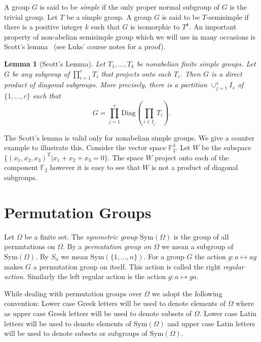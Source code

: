 \documentclass[11pt]{madras}%
\newtheorem{lemma}[theorem]{Lemma}
\theoremstyle{remark}
\newcommand{\Sym}[1]{{\ensuremath{\mathrm{Sym}\left(#1\right)}}}
\newcommand{\Diag}[2][]{{\ensuremath{\mathrm{Diag}_{{#1}}\left(#2\right)}}}
\newcommand{\bigtimes}{\prod}
\newcommand{\nomclpermg}[3][]{{\nomenclature[p#1]{#2}{#3}}}
\begin{document}
A group $G$ is said to be \emph{simple} if the only proper normal
subgroup of $G$ is the trivial group.  Let $T$ be a simple group. A
group $G$ is said to be $T$-semisimple if there is a positive integer
$k$ such that $G$ is isomorphic to $T^k$.  An important property of
non-abelian semisimple group which we will use in many occasions is
Scott's lemma~\cite{scott1980representation} (see Luks' course notes
for a proof\cite[page 38]{luks90lecture}).%
%

\begin{lemma}[Scott's Lemma]\label{lem-scott}
  Let $T_1,\ldots,T_k$ be nonabelian finite simple groups. Let $G$ be
  any subgroup of $\prod_{i=1}^r T_i$ that projects \emph{onto} each
  $T_i$.  Then $G$ is a direct product of diagonal subgroups. More
  precisely, there is a partition $\cup_{j=1}^s I_s$ of
  $\{1,\ldots,r\}$ such that
  \[
  G=\prod_{j=1}^s\Diag{\bigtimes_{i\in I_j}T_i}.
  \]
\end{lemma}

The Scott's lemma is valid only for nonabelian simple groups. We give
a counter example to illustrate this. Consider the vector space
$\mathbb{F}_2^3$. Let $W$ be the subspace $\{ (x_1,x_2,x_3)^\mathrm{T}
| x_1 + x_2 + x_3 = 0 \}$. The space $W$ project onto each of the
component $\mathbb{F}_2$ however it is easy to see that $W$ is not a product
of diagonal subgroups.



\section{Permutation Groups}

Let $\Omega$ be a finite set. The \emph{symmetric
  group} $\Sym{\Omega}$ is the group of all
permutations on $\Omega$.  By a \emph{permutation group on $\Omega$}
we mean a subgroup of $\Sym{\Omega}$. By $S_n$ we mean $\Sym{\{
  1,\ldots, n \}}$. For a group $G$ the action $g: a \mapsto ag$ makes
$G$ a permutation group on itself. This action is called the right
\emph{regular action}.   Similarly the left
regular action is the action $g: a \mapsto ga$.%
\nomclpermg{$\Sym{\Omega}$}{symmetric group on the set $\Omega$}%
\nomclpermg{$S_n$}{$\Sym{\{1,\ldots,n\}}$}

While dealing with permutation groups over $\Omega$ we adopt the
following convention: Lower case Greek letters will be used to denote
elements of $\Omega$ where as upper case Greek letters will be used to
denote subsets of $\Omega$. Lower case Latin letters will be used to
denote elements of $\Sym{\Omega}$ and upper case Latin letters will be
used to denote subsets or subgroups of $\Sym{\Omega}$.
\end{document}
